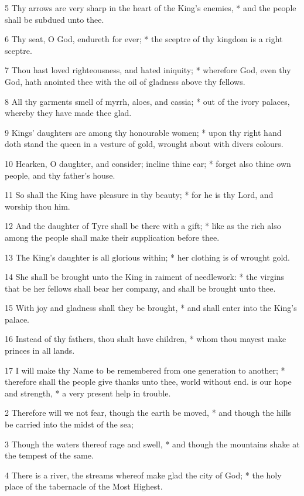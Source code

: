 5 Thy arrows are very sharp in the heart of the King's enemies, * and the people shall be subdued unto thee.\par
6 Thy seat, O God, endureth for ever; * the sceptre of thy kingdom is a right sceptre.\par
7 Thou hast loved righteousness, and hated iniquity; * wherefore God, even thy God, hath anointed thee with the oil of gladness above thy fellows.\par
8 All thy garments smell of myrrh, aloes, and cassia; * out of the ivory palaces, whereby they have made thee glad.\par
9 Kings' daughters are among thy honourable women; * upon thy right hand doth stand the queen in a vesture of gold, wrought about with divers colours.\par
10 Hearken, O daughter, and consider; incline thine ear; * forget also thine own people, and thy father's house.\par
11 So shall the King have pleasure in thy beauty; * for he is thy Lord, and worship thou him.\par
12 And the daughter of Tyre shall be there with a gift; * like as the rich also among the people shall make their supplication before thee.\par
13 The King's daughter is all glorious within; * her clothing is of wrought gold.\par
14 She shall be brought unto the King in raiment of needlework: * the virgins that be her fellows shall bear her company, and shall be brought unto thee.\par
15 With joy and gladness shall they be brought, * and shall enter into the King's palace.\par
16 Instead of thy fathers, thou shalt have children, * whom thou mayest make princes in all lands.\par
17 I will make thy Name to be remembered from one generation to another; * therefore shall the people give thanks unto thee, world without end.
 is our hope and strength, * a very present help in trouble.\par
2 Therefore will we not fear, though the earth be moved, * and though the hills be carried into the midst of the sea;\par
3 Though the waters thereof rage and swell, * and though the mountains shake at the tempest of the same.\par
4 There is a river, the streams whereof make glad the city of God; * the holy place of the tabernacle of the Most Highest.\par
